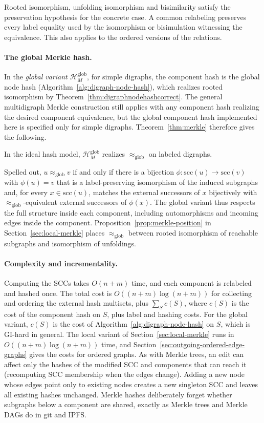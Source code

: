 \documentclass[twoside,leqno]{article}
\newcommand{\HMg}{\mathcal{H}_{M}^{\mathrm{glob}}}
\newcommand{\eqg}{\approx_{\mathrm{glob}}}
\newcommand{\Scc}{\mathrm{scc}}
\begin{document}
Rooted isomorphism, unfolding isomorphism and bisimilarity satisfy the preservation hypothesis for the concrete case. A common relabeling preserves every label equality used by the isomorphism or bisimulation witnessing the equivalence. This also applies to the ordered versions of the relations.

\paragraph{The global Merkle hash.} In the \emph{global variant} $\HMg$, for simple digraphs, the component hash is the global node hash (Algorithm~\ref{alg:digraph-node-hash}), which realizes rooted isomorphism by Theorem~\ref{thm:digraphnodehashcorrect}. The general multidigraph Merkle construction still applies with any component hash realizing the desired component equivalence, but the global component hash implemented here is specified only for simple digraphs. Theorem~\ref{thm:merkle} therefore gives the following.

\begin{cor}
\label{cor:merkle-global}
In the ideal hash model, $\HMg$ realizes $\eqg$ on labeled digraphs.
\end{cor}

Spelled out, $u\eqg v$ if and only if there is a bijection $\phi:\Scc(u)\to \Scc(v)$ with $\phi(u)=v$ that is a label-preserving isomorphism of the induced subgraphs and, for every $x\in \Scc(u)$, matches the external successors of $x$ bijectively with $\eqg$-equivalent external successors of $\phi(x)$. The global variant thus respects the full structure inside each component, including automorphisms and incoming edges inside the component. Proposition~\ref{prop:merkle-position} in Section~\ref{sec:local-merkle} places $\eqg$ between rooted isomorphism of reachable subgraphs and isomorphism of unfoldings.

\paragraph{Complexity and incrementality.} Computing the SCCs takes $O(n+m)$ time, and each component is relabeled and hashed once. The total cost is $O((n+m)\log(n+m))$ for collecting and ordering the external hash multisets, plus $\sum_S c(S)$, where $c(S)$ is the cost of the component hash on $S$, plus label and hashing costs. For the global variant, $c(S)$ is the cost of Algorithm~\ref{alg:digraph-node-hash} on $S$, which is GI-hard in general. The local variant of Section~\ref{sec:local-merkle} runs in $O((n+m)\log(n+m))$ time, and Section~\ref{sec:outgoing-ordered-edge-graphs} gives the costs for ordered graphs. As with Merkle trees, an edit can affect only the hashes of the modified SCC and components that can reach it (recomputing SCC membership when the edges change). Adding a new node whose edges point only to existing nodes creates a new singleton SCC and leaves all existing hashes unchanged. Merkle hashes deliberately forget whether subgraphs below a component are shared, exactly as Merkle trees and Merkle DAGs do in git and IPFS.
\end{document}
